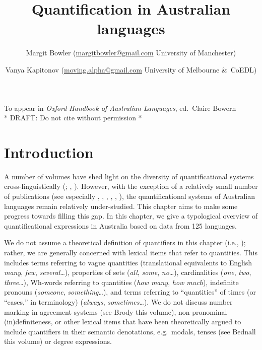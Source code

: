 \documentclass[12pt,egregdoesnotlikesansseriftitles]{scrartcl}
\title{Quantification in Australian languages}
\author{Margit Bowler ({\href{mailto:margitbowler@gmail.com}{margitbowler@gmail.com}} University of Manchester) \and \vspace{-.5cm}Vanya Kapitonov ({\href{mailto:moving.alpha@gmail.com}{moving.alpha@gmail.com}} University of Melbourne \&\ CoEDL)}
\begin{document}
\maketitle

\begin{center}
To appear in \textit{Oxford Handbook of Australian Languages}, ed.\ Claire Bowern\\
* DRAFT: Do not cite without permission *
\end{center}

\section{Introduction}

A number of volumes have shed light on the diversity of quantificational systems cross-linguistically (\citealt{keenanpaperno17,keenanpaperno12};  \citealt{qclp08}, \citealt{bachetal95}). However, with the exception of a relatively small number of publications (see especially \citealt{bowler17}, \citealt{bowernzentz12}, \citealt{alpher01},  \citealt{bittnerhale95}, \citealt{evans95}, \citealt{laughren81}), the quantificational systems of Australian languages remain relatively under-studied. This chapter aims to make some progress towards filling this gap. In this chapter, we give a typological overview of quantificational expressions in Australia based on data from 125 languages.

We do not assume a theoretical definition of quantifiers in this chapter (i.e., \citealt{heimkratzer98}); rather, we are generally concerned with lexical items that refer to quantities. This includes terms referring to vague quantities (translational equivalents to English \textit{many}, \textit{few}, \textit{several}\ldots), properties of sets (\textit{all}, \textit{some}, \textit{no}\ldots), cardinalities (\textit{one}, \textit{two}, \textit{three}\ldots), Wh-words referring to quantities (\textit{how many}, \textit{how much}), indefinite pronouns (\textit{someone}, \textit{something}\ldots), and terms referring to ``quantities'' of times (or ``cases,'' in  terminology) (\textit{always}, \textit{sometimes}\ldots). We do not discuss number marking in agreement systems (see Brody this volume), non-pronominal (in)definiteness, or other lexical items that have been theoretically argued to include quantifiers in their semantic denotations, e.g.\ modals, tenses (see Bednall this volume) or degree expressions.
\end{document}
